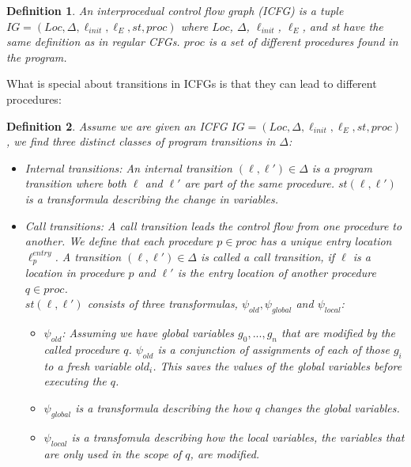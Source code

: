 \documentclass{article}
\newtheorem{mydef}{Definition}
\begin{document}
	\begin{mydef}
		An interprocedual control flow graph (ICFG) is a tuple \\$IG = (Loc, \Delta, \ell_{init}, \ell_E, st, proc)$ where $Loc$, $\Delta$, $\ell_{init}$, $\ell_E$, and st have the same definition as in regular CFGs. $proc$ is a set of different procedures found in the program. 
	\end{mydef}
	What is special about transitions in ICFGs is that they can lead to different procedures:
	\begin{mydef} Assume we are given an ICFG $IG = (Loc, \Delta, \ell_{init}, \ell_E, st, proc)$, we find three distinct classes of program transitions in $\Delta$:
		\begin{itemize}
			\item Internal transitions: An internal transition $(\ell, \ell') \in \Delta$ is a program transition where both $\ell$ and $\ell'$ are part of the same procedure. $st(\ell, \ell')$ is a transformula describing the change in variables.
			
			\item Call transitions:  A call transition leads the control flow from one procedure to another. We define that each procedure $p \in proc$ has a unique entry location $\ell^{entry}_p$. A transition $(\ell, \ell') \in \Delta$ is called a call transition, if $\ell$ is a location in procedure $p$ and $\ell'$ is the entry location of another procedure $q \in proc$. \\ $st(\ell, \ell')$ consists of three transformulas, $\psi_{old}, \psi_{global}$ and $\psi_{local}$: 
			\begin{itemize}
				\item$\psi_{old}$: Assuming we have global variables $g_0, ..., g_n$ that are modified by the called procedure $q$. $\psi_{old}$ is a conjunction of assignments of each of those $g_i$ to a fresh variable $old_{i}$. This saves the values of the global variables before executing the $q$. 
				\item $\psi_{global}$ is a transformula describing the how $q$ changes the global variables.
				\item $\psi_{local}$ is a transfomula describing how the local variables, the variables that are only used in the scope of $q$, are modified.
			\end{itemize}
			

\end{itemize}
\end{mydef}
\end{document}
